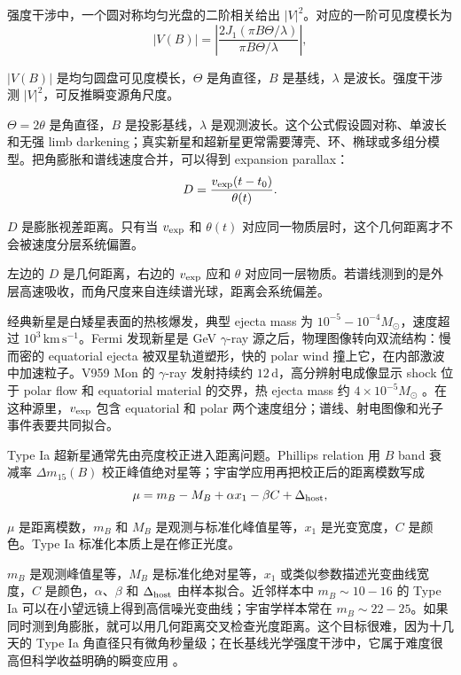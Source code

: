 强度干涉中，一个圆对称均匀光盘的二阶相关给出 \(|V|^2\)。对应的一阶可见度模长为
\begin{equation}
  |V(B)|=
  \left|
  \frac{2J_1(\pi B\Theta/\lambda)}{\pi B\Theta/\lambda}
  \right|,
  \label{eq:ch13-uniform-disk-visibility}
\end{equation}
\begin{formulaexplain}
\(|V(B)|\) 是均匀圆盘可见度模长，\(\Theta\) 是角直径，\(B\) 是基线，\(\lambda\) 是波长。强度干涉测 \(|V|^2\)，可反推瞬变源角尺度。
\end{formulaexplain}
\(\Theta=2\theta\) 是角直径，\(B\) 是投影基线，\(\lambda\) 是观测波长。这个公式假设圆对称、单波长和无强 limb darkening；真实新星和超新星更常需要薄壳、环、椭球或多组分模型。把角膨胀和谱线速度合并，可以得到 expansion parallax：
\begin{equation}
  D=\frac{v_{\rm exp}(t-t_0)}{\theta(t)}.
  \label{eq:ch13-expansion-parallax}
\end{equation}
\begin{formulaexplain}
\(D\) 是膨胀视差距离。只有当 \(v_{\rm exp}\) 和 \(\theta(t)\) 对应同一物质层时，这个几何距离才不会被速度分层系统偏置。
\end{formulaexplain}
左边的 \(D\) 是几何距离，右边的 \(v_{\rm exp}\) 应和 \(\theta\) 对应同一层物质。若谱线测到的是外层高速吸收，而角尺度来自连续谱光球，距离会系统偏差。

经典新星是白矮星表面的热核爆发，典型 ejecta mass 为 \(10^{-5}-10^{-4}M_\odot\)，速度超过 \(10^3\,\mathrm{km\,s^{-1}}\)。Fermi 发现新星是 GeV \(\gamma\)-ray 源之后，物理图像转向双流结构：慢而密的 equatorial ejecta 被双星轨道塑形，快的 polar wind 撞上它，在内部激波中加速粒子。V959 Mon 的 \(\gamma\)-ray 发射持续约 \(12\,\mathrm{d}\)，高分辨射电成像显示 shock 位于 polar flow 和 equatorial material 的交界，热 ejecta mass 约 \(4\times10^{-5}M_\odot\) \citep{2014Natur.514..339C,2014Sci...345..554A}。在这种源里，\(v_{\rm exp}\) 包含 equatorial 和 polar 两个速度组分；谱线、射电图像和光子事件表要共同拟合。

Type Ia 超新星通常先由亮度校正进入距离问题。Phillips relation 用 \(B\) band 衰减率 \(\Delta m_{15}(B)\) 校正峰值绝对星等；宇宙学应用再把校正后的距离模数写成
\begin{equation}
  \mu = m_B - M_B + \alpha x_1-\beta C+\Delta_{\rm host},
  \label{eq:ch13-snia-distance-modulus}
\end{equation}
\begin{formulaexplain}
\(\mu\) 是距离模数，\(m_B\) 和 \(M_B\) 是观测与标准化峰值星等，\(x_1\) 是光变宽度，\(C\) 是颜色。Type Ia 标准化本质上是在修正光度。
\end{formulaexplain}
\(m_B\) 是观测峰值星等，\(M_B\) 是标准化绝对星等，\(x_1\) 或类似参数描述光变曲线宽度，\(C\) 是颜色，\(\alpha\)、\(\beta\) 和 \(\Delta_{\rm host}\) 由样本拟合。近邻样本中 \(m_B\sim10-16\) 的 Type Ia 可以在小望远镜上得到高信噪光变曲线；宇宙学样本常在 \(m_B\sim22-25\)。如果同时测到角膨胀，就可以用几何距离交叉检查光度距离。这个目标很难，因为十几天的 Type Ia 角直径只有微角秒量级；在长基线光学强度干涉中，它属于难度很高但科学收益明确的瞬变应用 \citep{1993ApJ...413L.105P,1998AJ....116.1009R,1999ApJ...517..565P}。


